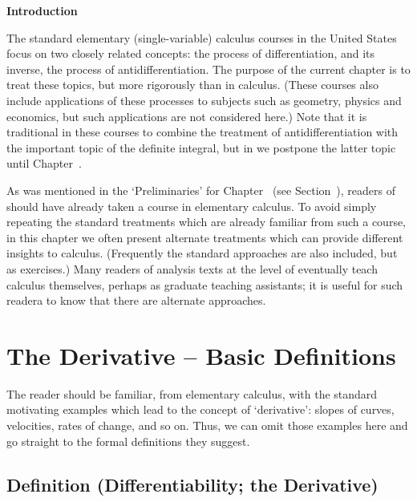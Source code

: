 \VV

            \small{\bf Introduction}

\V

       The standard elementary (single-variable) calculus courses in the United States focus on two closely related concepts:
    the process of differentiation, and its inverse, the process of antidifferentiation. The purpose of the current chapter is to treat these topics, but more rigorously than in calculus.
    (These courses also include applications of these processes to subjects such as geometry, physics and economics, but such applications are not considered here.)
    Note that it is traditional in these courses to combine the treatment of antidifferentiation with the important topic of the definite integral,
    but in {\ThisText} we postpone the latter topic until Chapter~.

    As was mentioned in the `Preliminaries' for Chapter~ (see Section~), readers of {\ThisText} should have already taken a course in elementary calculus.
    To avoid simply repeating the standard treatments which are already familiar from such a course,
    in this chapter we often present alternate treatments which can provide different insights to calculus. (Frequently the standard approaches are also included, but as exercises.)
    Many readers of analysis texts at the level of {\ThisText} eventually teach calculus themselves, perhaps as graduate teaching assistants;
    it is useful for such readera to know that there are alternate approaches.

\VV

                \section{{\bf The Derivative -- Basic Definitions}}
                \label{SectE20}
        
\VV

        The reader should be familiar, from elementary calculus, with the standard motivating examples which lead to the concept of `derivative':
    slopes of curves, velocities, rates of change, and so on. Thus, we can omit those examples here and go straight to the formal definitions they suggest.

\V

            \subsection{\small{\bf Definition} (Differentiability; the Derivative)}
            \label{DefE20.20}

